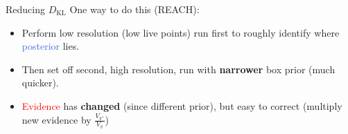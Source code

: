 \documentclass[aspectratio=169, 11pt]{beamer}
\begin{document}
\begin{frame}{Reducing $D_{\textrm{KL}}$}
\vspace{3.5em}
One way to do this (REACH):

\begin{minipage}[]{0.45\textwidth}\vspace{22em}
\end{minipage}
\begin{minipage}{0.45\textwidth}\vspace{-8em}
\begin{itemize}
    \item<1-> Perform low resolution (low live points) run first to roughly identify where \textcolor{RoyalBlue}{posterior} lies.
    \item<2-> Then set off second, high resolution, run with \textbf{narrower} box \textcolor{BurntOrange}{prior} (much quicker).
    \item<3-> \textcolor{red}{Evidence} has \textbf{changed} (since different prior), but easy to correct (multiply new evidence by $\frac{V_{\pi^\ast}}{V_\pi}$)
\end{itemize}
\end{minipage}

\end{frame}
\end{document}
